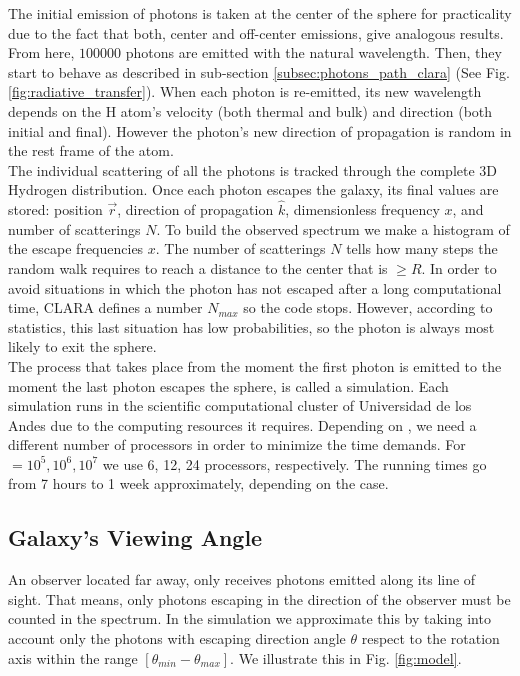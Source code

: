 \documentclass[twocolappendix]{latex/emulateapj}
\begin{document}
The initial emission of photons is taken at the center of the sphere for practicality due to the fact that both, center and off-center emissions, give analogous results. From here, $100000$ photons are emitted with the natural \lya wavelength. Then, they start to behave as described in sub-section \ref{subsec:photons_path_clara} (See Fig. \ref{fig:radiative_transfer}). When each photon is re-emitted, its new wavelength depends on the H atom's velocity (both thermal and bulk) and direction (both initial and final). However the photon's new direction of propagation is random in the rest frame of the atom. \\ 

The individual scattering of all the photons is tracked through the complete 3D Hydrogen distribution. Once each photon escapes the galaxy, its final values are stored: position $\vec{r}$, direction of propagation $\hat{k}$, dimensionless frequency $x$, and number of scatterings $N$. To build the observed spectrum we make a histogram of the escape frequencies $x$. The number of scatterings $N$ tells how many steps the random walk requires to reach a distance to the center that is $\geq R$. In order to avoid situations in which the photon has not escaped after a long computational time, CLARA defines a number $N_{max}$ so the code stops. However, according to statistics, this last situation has low probabilities, so the photon is always most likely to exit the sphere. \\

The process that takes place from the moment the first photon is emitted to the moment the last photon escapes the sphere, is called a simulation. Each simulation runs in the scientific computational cluster of Universidad de los Andes due to the computing resources it requires. Depending on \tauh, we need a different number of processors in order to minimize the time demands. For \tauh $=10^5, 10^6, 10^7$ we use 6, 12, 24 processors, respectively. The running times go from 7 hours to 1 week approximately, depending on the case. \\

\subsection{Galaxy's Viewing Angle}
An observer located far away, only receives photons emitted along its line of sight. That means, only photons escaping in the direction of the observer must be counted in the spectrum. In the simulation we approximate this by taking into account only the photons with escaping direction angle $\theta$ respect to the rotation axis within the range $[\theta_{min}-\theta_{max}]$. We illustrate this in Fig. \ref{fig:model}. \\
\end{document}

